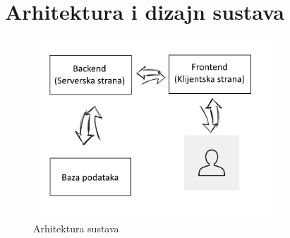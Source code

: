 			
						
					\chapter{Arhitektura i dizajn sustava}
			
			\begin{figure}[h]
				\centering
				\includegraphics[width=0.8\textwidth]{slike/arhitektura-slika.jpg}
				\caption{Arhitektura sustava}
			\end{figure}
			
